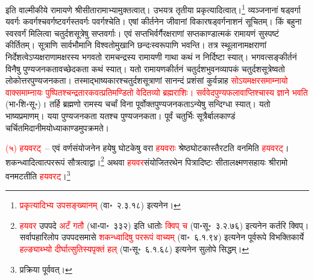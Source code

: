 \begin{sloppypar}\justifying\noindent इति वाल्मीकीये रामायणे श्री\-सीता\-रामाभ्यामुक्तत्वात्। उभयत्र तृतीया प्रकृत्यादित्वात्।\footnote{\textcolor{red}{प्रकृत्यादिभ्य उपसङ्ख्यानम्} (वा॰~२.३.१८) इत्यनेन।} व्यञ्जनानां षड्वर्गा यवर्गः कवर्गश्चवर्गष्टवर्गस्तवर्गः पवर्गश्चेति। एषां कीर्तनेन जीवानां विकार\-षड्वर्ग\-नाशनं सूचितम्। किं बहुना स्वर\-वर्गं मिलित्वा चतुर्दश\-सूत्रेषु सप्त\-वर्गाः। एवं सप्तभिर्वर्गैरक्षराणां सप्त\-काण्डात्मकं रामायणं सुस्पष्टं कीर्तितम्। सूत्राणि सार्वभौमानि विश्वतोमुखानि छन्दः\-स्वरूपाणि भवन्ति। तत्र स्थूलानामक्षराणां निर्देशत्वेऽप्यक्षराणामक्षरस्य भगवतो रामचन्द्रस्य रामायणी गाथा कथं न निर्दिष्टा स्यात्। भगवत्सङ्कीर्तनं विनैषु पुण्य\-जनकतावच्छेदकता कथं स्यात्। यतो रामायण\-कीर्तनं चतुर्दश\-भुवन\-व्यापकं चतुर्दश\-सूत्रेष्वतो लोकोत्तर\-पुण्य\-जनकता। तस्माद्भाष्यकारश्चतुर्दश\-सूत्राणां सानन्दं प्रशंसां कुर्वन्नाह \textcolor{red}{सोऽयमक्षर\-समाम्नायो वाक्समाम्नायः पुष्पितश्चन्द्र\-तारकवत्प्रतिमण्डितो वेदितव्यो ब्रह्म\-राशिः। सर्व\-वेद\-पुण्य\-फलावाप्तिश्चास्य ज्ञाने भवति} (भा॰शि॰सू॰)। तर्हि ब्रह्मणो रामस्य चर्चां विना पूर्वोक्त\-पुण्यजनकताऽन्येषु सन्दिग्धा स्यात्। यतो भाष्य\-प्रमाणम्। यया पुण्यजनकता यतश्च पुण्यजनकता। पूर्वं
चतुर्भिः सूत्रैर्बालकाण्डं चर्चितमिदानीमयोध्याकाण्डमुपक्रमते।\end{sloppypar}
\begin{sloppypar}\justifying\noindent\hspace{10mm} \textcolor{red}{(५) हयवरट्}~– एवं वर्ण\-संयोजनेन हयेषु घोटकेषु वरा \textcolor{red}{हयवराः} श्रेष्ठ\-घोटकास्तैरटति वनमिति \textcolor{red}{हयवरट्}। शकन्ध्वादित्वात्पररूपं सौत्रत्वाद्वा।\footnote{\textcolor{red}{हयवर} उपपदे \textcolor{red}{अटँ गतौ} (धा॰पा॰~३३२) इति धातोः \textcolor{red}{क्विप् च} (पा॰सू॰~३.२.७६) इत्यनेन कर्तरि क्विप्। सर्वापहारि\-लोप उपपद\-समासे \textcolor{red}{शकन्ध्वादिषु पररूपं वाच्यम्} (वा॰~६.१.९४) इत्यनेन पूर्वरूपे विभक्तिकार्ये \textcolor{red}{हल्ङ्याब्भ्यो दीर्घात्सुतिस्यपृक्तं हल्} (पा॰सू॰~६.१.६८) इत्यनेन सुलोपे सिद्धम्।} अथवा \textcolor{red}{हयवर}\-संयोजित\-रथेन पित्रादिष्टः सीता\-लक्ष्मण\-सहायः श्रीरामो वनमटतीति \textcolor{red}{हयवरट्}।\footnote{प्रक्रिया पूर्ववत्।}\end{sloppypar}
